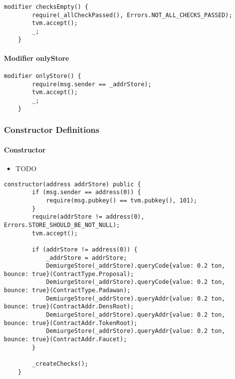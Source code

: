\begin{lstlisting}[firstnumber=66]
    modifier checksEmpty() {
        require(_allCheckPassed(), Errors.NOT_ALL_CHECKS_PASSED);
        tvm.accept();
        _;
    }
\end{lstlisting}

\paragraph{Modifier onlyStore}


\begin{lstlisting}[firstnumber=72]
    modifier onlyStore() {
        require(msg.sender == _addrStore);
        tvm.accept();
        _;
    }
\end{lstlisting}

\subsubsection{Constructor Definitions}


\paragraph{Constructor}

\begin{itemize}
\item TODO
\end{itemize}

\begin{lstlisting}[firstnumber=82]
    constructor(address addrStore) public {
        if (msg.sender == address(0)) {
            require(msg.pubkey() == tvm.pubkey(), 101);
        }
        require(addrStore != address(0), Errors.STORE_SHOULD_BE_NOT_NULL);
        tvm.accept();
        
        if (addrStore != address(0)) {
            _addrStore = addrStore;
            DemiurgeStore(_addrStore).queryCode{value: 0.2 ton, bounce: true}(ContractType.Proposal);
            DemiurgeStore(_addrStore).queryCode{value: 0.2 ton, bounce: true}(ContractType.Padawan);
            DemiurgeStore(_addrStore).queryAddr{value: 0.2 ton, bounce: true}(ContractAddr.DensRoot);
            DemiurgeStore(_addrStore).queryAddr{value: 0.2 ton, bounce: true}(ContractAddr.TokenRoot);
            DemiurgeStore(_addrStore).queryAddr{value: 0.2 ton, bounce: true}(ContractAddr.Faucet);
        }

        _createChecks();
    }
\end{lstlisting}

